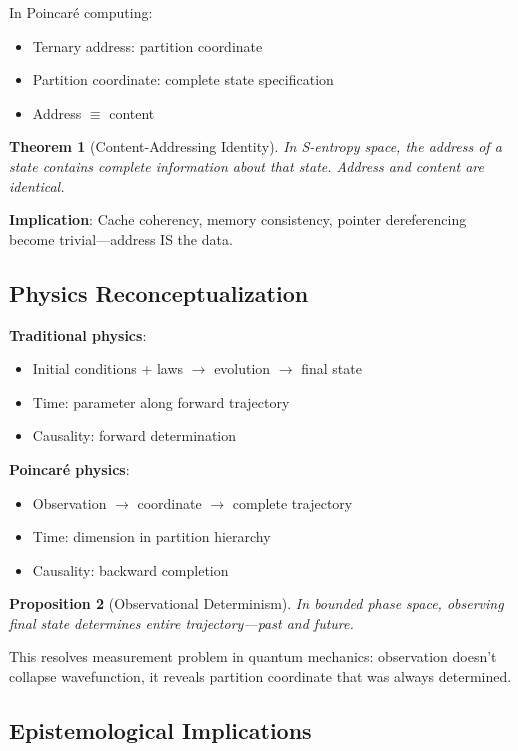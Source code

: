 \documentclass[twocolumn,10pt]{article}
\newtheorem{theorem}{Theorem}
\newtheorem{proposition}[theorem]{Proposition}
\begin{document}
In Poincaré computing:
\begin{itemize}
\item Ternary address: partition coordinate
\item Partition coordinate: complete state specification
\item Address $\equiv$ content
\end{itemize}

\begin{theorem}[Content-Addressing Identity]
In S-entropy space, the address of a state contains complete information about that state. Address and content are identical.
\end{theorem}

\textbf{Implication}: Cache coherency, memory consistency, pointer dereferencing become trivial—address IS the data.

\subsection{Physics Reconceptualization}

\textbf{Traditional physics}:
\begin{itemize}
\item Initial conditions + laws $\to$ evolution $\to$ final state
\item Time: parameter along forward trajectory
\item Causality: forward determination
\end{itemize}

\textbf{Poincaré physics}:
\begin{itemize}
\item Observation $\to$ coordinate $\to$ complete trajectory
\item Time: dimension in partition hierarchy
\item Causality: backward completion
\end{itemize}

\begin{proposition}[Observational Determinism]
In bounded phase space, observing final state determines entire trajectory—past and future.
\end{proposition}

This resolves measurement problem in quantum mechanics: observation doesn't collapse wavefunction, it reveals partition coordinate that was always determined.

\subsection{Epistemological Implications}
\end{document}
